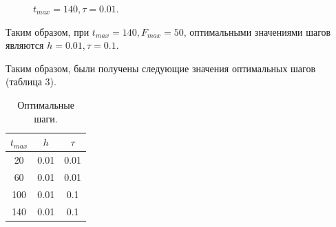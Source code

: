 \documentclass[a4paper,14pt]{article}
\begin{document}
\begin{figure}[!h]
	\caption{$t_{max} = 140, \tau = 0.01$.}
	\label{fig:140001}
\end{figure}

Таким образом, при $t_{max} = 140, F_{max} = 50$, оптимальными
значениями шагов являются $h = 0.01, \tau = 0.1$.

Таким образом, были получены следующие значения оптимальных
шагов (таблица 3).

\begin{table}[!h]
	\caption{Оптимальные шаги.}
	\begin{center}
	\begin{tabular}{| c | c | c |}
	\hline
	$t_{max}$ & $h$ & $\tau$ \\
	\hline
	20 & 0.01 & 0.01 \\
	60 & 0.01 & 0.01 \\
	100 & 0.01 & 0.1 \\
	140 & 0.01 & 0.1 \\
	\hline
	\end{tabular}
	\end{center}
\end{table}
\end{document}
